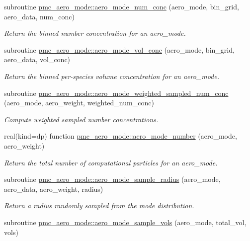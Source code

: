 \begin{DoxyCompactItemize}
subroutine \mbox{\hyperlink{namespacepmc__aero__mode_ab66d248f61d08547c4acd818f6a57dc2}{pmc\+\_\+aero\+\_\+mode\+::aero\+\_\+mode\+\_\+num\+\_\+conc}} (aero\+\_\+mode, bin\+\_\+grid, aero\+\_\+data, num\+\_\+conc)
\begin{DoxyCompactList}\small\item\em Return the binned number concentration for an aero\+\_\+mode. \end{DoxyCompactList}\item 
subroutine \mbox{\hyperlink{namespacepmc__aero__mode_a2f932ab06c4f3ebb225150803cb41e67}{pmc\+\_\+aero\+\_\+mode\+::aero\+\_\+mode\+\_\+vol\+\_\+conc}} (aero\+\_\+mode, bin\+\_\+grid, aero\+\_\+data, vol\+\_\+conc)
\begin{DoxyCompactList}\small\item\em Return the binned per-\/species volume concentration for an aero\+\_\+mode. \end{DoxyCompactList}\item 
subroutine \mbox{\hyperlink{namespacepmc__aero__mode_a3ed922890993f9d3f7b0bdbd0a60e802}{pmc\+\_\+aero\+\_\+mode\+::aero\+\_\+mode\+\_\+weighted\+\_\+sampled\+\_\+num\+\_\+conc}} (aero\+\_\+mode, aero\+\_\+weight, weighted\+\_\+num\+\_\+conc)
\begin{DoxyCompactList}\small\item\em Compute weighted sampled number concentrations. \end{DoxyCompactList}\item 
real(kind=dp) function \mbox{\hyperlink{namespacepmc__aero__mode_aa2bc2252ff28ddb14f953f554a9afd62}{pmc\+\_\+aero\+\_\+mode\+::aero\+\_\+mode\+\_\+number}} (aero\+\_\+mode, aero\+\_\+weight)
\begin{DoxyCompactList}\small\item\em Return the total number of computational particles for an {\ttfamily aero\+\_\+mode}. \end{DoxyCompactList}\item 
subroutine \mbox{\hyperlink{namespacepmc__aero__mode_aff49b68e86fb9ba501fb2d33ba8a7a46}{pmc\+\_\+aero\+\_\+mode\+::aero\+\_\+mode\+\_\+sample\+\_\+radius}} (aero\+\_\+mode, aero\+\_\+data, aero\+\_\+weight, radius)
\begin{DoxyCompactList}\small\item\em Return a radius randomly sampled from the mode distribution. \end{DoxyCompactList}\item 
subroutine \mbox{\hyperlink{namespacepmc__aero__mode_aa79b2639f969c59afff4508ef90fdf67}{pmc\+\_\+aero\+\_\+mode\+::aero\+\_\+mode\+\_\+sample\+\_\+vols}} (aero\+\_\+mode, total\+\_\+vol, vols)

\end{DoxyCompactItemize}
